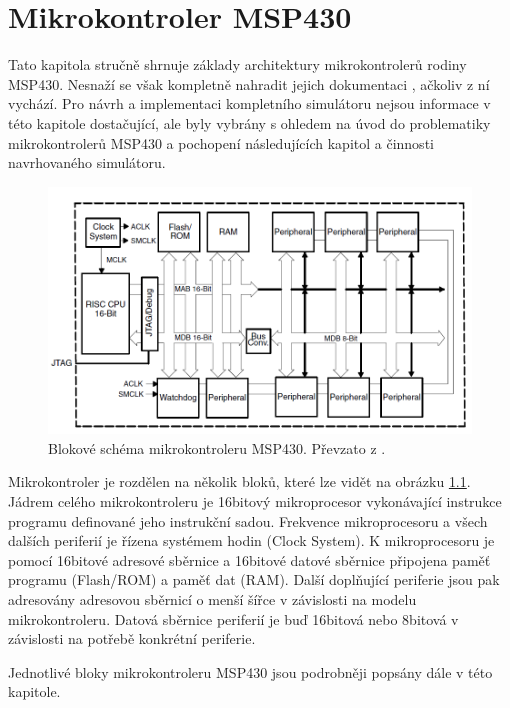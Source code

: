 \chapter{Mikrokontroler MSP430}

Tato kapitola stručně shrnuje základy architektury mikrokontrolerů rodiny MSP430. Nesnaží se však kompletně nahradit jejich dokumentaci \cite{msp430family} \cite{msp430book}, ačkoliv z ní vychází. Pro návrh a implementaci kompletního simulátoru nejsou informace v této kapitole dostačující, ale byly vybrány s ohledem na úvod do problematiky mikrokontrolerů MSP430 a pochopení následujících kapitol a činnosti navrhovaného simulátoru.

\begin{figure}[ht]
\centering
\includegraphics[trim=0cm 0cm 0cm 0cm, scale=0.5]{fig/msp430block}
\caption{Blokové schéma mikrokontroleru MSP430. Převzato z \cite{msp430family}.}
\label{fig:msp430block}
\end{figure}

Mikrokontroler je rozdělen na několik bloků, které lze vidět na obrázku \ref{fig:msp430block}. Jádrem celého mikrokontroleru je 16bitový mikroprocesor
vykonávající instrukce programu definované jeho instrukční sadou. Frekvence mikroprocesoru a všech dalších periferií je řízena systémem hodin (Clock System). K mikroprocesoru je pomocí 16bitové adresové sběrnice a 16bitové datové sběrnice připojena paměť programu (Flash/ROM) a paměť dat (RAM). Další doplňující periferie jsou pak adresovány adresovou sběrnicí o menší šířce v závislosti na modelu mikrokontroleru. Datová sběrnice periferií je buď 16bitová nebo 8bitová v závislosti na potřebě konkrétní periferie.

Jednotlivé bloky mikrokontroleru MSP430 jsou podrobněji popsány dále v této kapitole.

